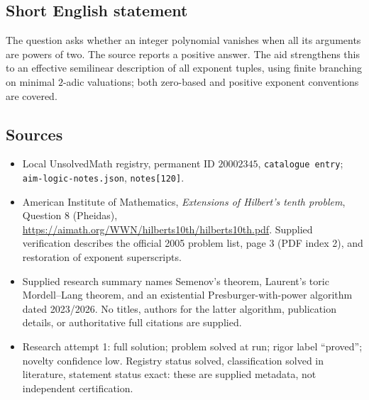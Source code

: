 \documentclass[11pt]{article}
\begin{document}
\subsection{Short English statement}
The question asks whether an integer polynomial vanishes when all its arguments are powers of two. The source reports a positive answer. The aid strengthens this to an effective semilinear description of all exponent tuples, using finite branching on minimal $2$-adic valuations; both zero-based and positive exponent conventions are covered.
\subsection{Sources}
\begin{itemize}
\item Local UnsolvedMath registry, permanent ID $20002345$, \texttt{catalogue entry}; \texttt{aim-logic-notes.json}, \texttt{notes[120]}.
\item American Institute of Mathematics, \emph{Extensions of Hilbert's tenth problem}, Question 8 (Pheidas), \url{https://aimath.org/WWN/hilberts10th/hilberts10th.pdf}. Supplied verification describes the official 2005 problem list, page 3 (PDF index 2), and restoration of exponent superscripts.
\item Supplied research summary names Semenov's theorem, Laurent's toric Mordell--Lang theorem, and an existential Presburger-with-power algorithm dated 2023/2026. No titles, authors for the latter algorithm, publication details, or authoritative full citations are supplied.
\item Research attempt 1: full solution; problem solved at run; rigor label ``proved''; novelty confidence low. Registry status solved, classification solved in literature, statement status exact: these are supplied metadata, not independent certification.
\end{itemize}
\end{document}
